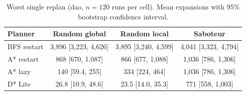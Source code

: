 \begin{table}[!t]
\centering
\footnotesize
\caption{Worst single replan (dao, $n=120$ runs per cell). Mean expansions with 95\% bootstrap confidence interval.}
\label{tab:hitch-dao}
\begin{tabular}{lccc}
\toprule
Planner & Random global & Random local & Saboteur \\
\midrule
BFS restart & 3,896 [3,223, 4,626] & 3,895 [3,240, 4,599] & 4,041 [3,323, 4,794] \\
A* restart & 868 [670, 1,087] & 866 [677, 1,088] & 1,036 [786, 1,306] \\
A* lazy & 140 [59.4, 255] & 334 [224, 464] & 1,036 [786, 1,306] \\
D* Lite & 26.8 [10.9, 48.6] & 23.5 [14.0, 35.3] & 771 [558, 1,003] \\
\bottomrule
\end{tabular}
\end{table}
